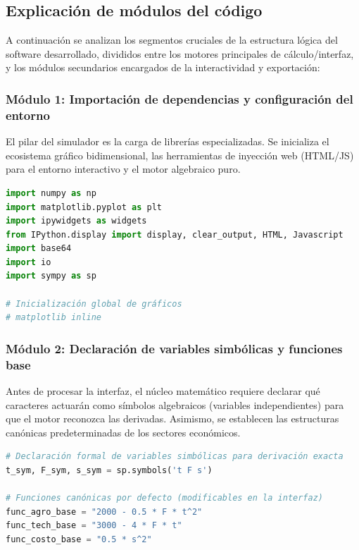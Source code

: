 \documentclass[12pt, a4paper]{article}
\begin{document}
\subsection{Explicación de módulos del código}
A continuación se analizan los segmentos cruciales de la estructura lógica del software desarrollado, divididos entre los motores principales de cálculo/interfaz, y los módulos secundarios encargados de la interactividad y exportación:

\subsubsection{Módulo 1: Importación de dependencias y configuración del entorno}
El pilar del simulador es la carga de librerías especializadas. Se inicializa el ecosistema gráfico bidimensional, las herramientas de inyección web (HTML/JS) para el entorno interactivo y el motor algebraico puro.

\begin{lstlisting}[language=Python, caption=Inicialización del entorno computacional y dependencias]
import numpy as np
import matplotlib.pyplot as plt
import ipywidgets as widgets
from IPython.display import display, clear_output, HTML, Javascript
import base64
import io
import sympy as sp

# Inicialización global de gráficos
# matplotlib inline
\end{lstlisting}

\subsubsection{Módulo 2: Declaración de variables simbólicas y funciones base}
Antes de procesar la interfaz, el núcleo matemático requiere declarar qué caracteres actuarán como símbolos algebraicos (variables independientes) para que el motor reconozca las derivadas. Asimismo, se establecen las estructuras canónicas predeterminadas de los sectores económicos.

\begin{lstlisting}[language=Python, caption=Definición del espacio algebraico continuo]
# Declaración formal de variables simbólicas para derivación exacta
t_sym, F_sym, s_sym = sp.symbols('t F s')

# Funciones canónicas por defecto (modificables en la interfaz)
func_agro_base = "2000 - 0.5 * F * t^2"
func_tech_base = "3000 - 4 * F * t"
func_costo_base = "0.5 * s^2"
\end{lstlisting}
\end{document}
